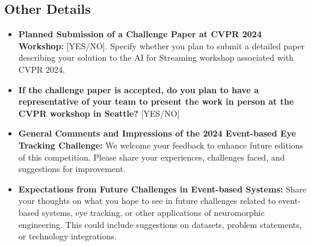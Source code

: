 \documentclass{article}
\begin{document}
\subsection{Other Details}
\begin{itemize}
    \item \textbf{Planned Submission of a Challenge Paper at CVPR 2024 Workshop:} [YES/NO]. Specify whether you plan to submit a detailed paper describing your solution to the AI for Streaming workshop associated with CVPR 2024.

    \item \textbf{If the challenge paper is accepted, do you plan to have a representative of your team to present the work in person at the CVPR workshop in Seattle?} [YES/NO]
    
    \item \textbf{General Comments and Impressions of the 2024 Event-based Eye Tracking Challenge:} We welcome your feedback to enhance future editions of this competition. Please share your experiences, challenges faced, and suggestions for improvement.
    
    \item \textbf{Expectations from Future Challenges in Event-based Systems:} Share your thoughts on what you hope to see in future challenges related to event-based systems, eye tracking, or other applications of neuromorphic engineering. This could include suggestions on datasets, problem statements, or technology integrations.
\end{itemize}
\end{document}
